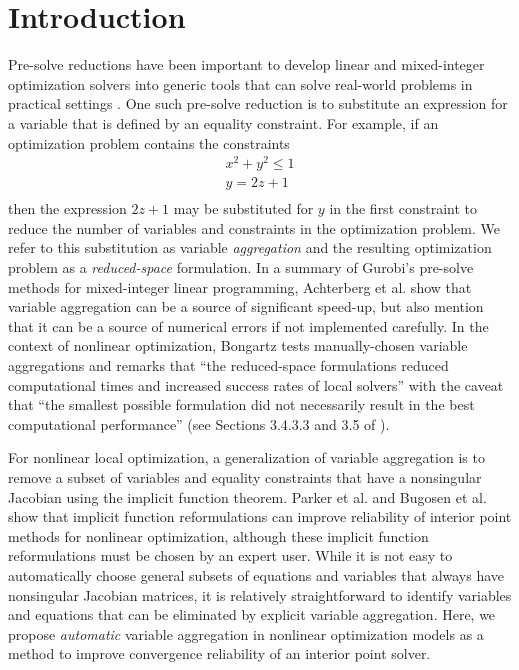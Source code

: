 \documentclass[smallextended]{svjour3}
\begin{document}
\section{Introduction}
Pre-solve reductions have been important to develop linear and
mixed-integer optimization solvers into generic tools that can solve
real-world problems in practical settings \cite{bixby2007}.
One such pre-solve reduction is to substitute an expression for a variable
that is defined by an equality constraint.
For example, if an optimization problem contains the constraints
\[
  \begin{array}{c}
    x^2 + y^2 \leq 1 \\
    y = 2z + 1 \\
  \end{array}
\]
then the expression $2z+1$ may be substituted for $y$ in the first constraint
to reduce the number of variables and constraints in the optimization problem.
We refer to this substitution as variable {\it aggregation} and the resulting
optimization problem as a {\it reduced-space} formulation.
In a summary of Gurobi's \cite{gurobimanual} pre-solve methods for mixed-integer
linear programming, Achterberg et al. \cite{achterberg2020} show that variable
aggregation can be a source of significant speed-up, but also mention that it
can be a source of numerical errors if not implemented carefully.
In the context of nonlinear optimization, Bongartz \cite{bongartzthesis}
tests manually-chosen variable aggregations and remarks that ``the reduced-space
formulations reduced computational times and increased success rates of local solvers''
with the caveat that ``the smallest possible formulation did not necessarily result in
the best computational performance'' (see Sections 3.4.3.3 and 3.5 of \cite{bongartzthesis}).

For nonlinear local optimization, a generalization of variable aggregation
is to remove a subset of variables and equality constraints that have a nonsingular
Jacobian using the implicit function theorem. Parker et al. \cite{parker2022}
and Bugosen et al. \cite{bugosen2024gibbs} show
that implicit function reformulations can improve reliability of interior point methods
for nonlinear optimization, although these implicit function reformulations must
be chosen by an expert user.
While it is not easy to automatically choose general subsets of equations and variables
that always have nonsingular Jacobian matrices, it is relatively straightforward to
identify variables and equations that can be eliminated by explicit variable aggregation.
Here, we propose {\it automatic} variable aggregation in nonlinear optimization models as a
method to improve convergence reliability of an interior point solver.
\end{document}
